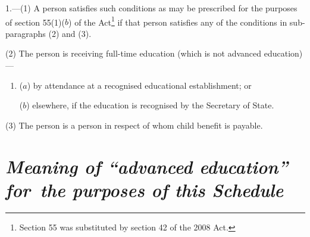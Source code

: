 \documentclass[a4paper,12pt]{article}
\begin{document}
1.---(1)   A person satisfies such conditions as may be prescribed for the purposes of section 55(1)($b$) of the Act\footnote{Section 55 was substituted by section 42 of the 2008 Act.} if that person satisfies any of the conditions in sub-paragraphs (2) and (3).

(2) The person is receiving full-time education (which is not advanced education)—
\begin{enumerate}\item[]
($a$) by attendance at a recognised educational establishment; or

($b$) elsewhere, if the education is recognised by the Secretary of State.
\end{enumerate}

(3) The person is a person in respect of whom child benefit is payable.


%

\section*{\itshape Meaning of “advanced education” for~the purposes of 
this Schedule%
}
\end{document}
